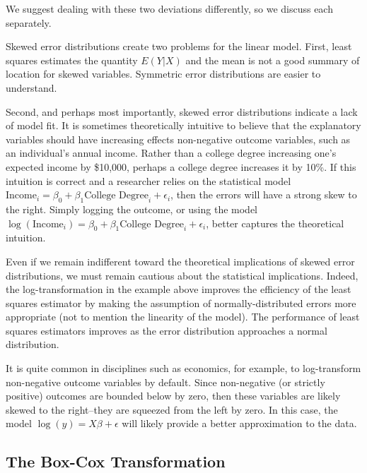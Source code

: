 \documentclass[12pt]{article}
\begin{document}
We suggest dealing with these two deviations differently, so we discuss each separately.

Skewed error distributions create two problems for the linear model. 
First, least squares estimates the quantity $E(Y | X)$ and the mean is not a good summary of location for skewed variables. 
Symmetric error distributions are easier to understand. 

Second, and perhaps most importantly, skewed error distributions indicate a lack of model fit. 
It is sometimes theoretically intuitive to believe that the explanatory variables should have increasing effects non-negative outcome variables, such as an individual's annual income. 
Rather than a college degree increasing one's expected income by \$10,000, perhaps a college degree increases it by 10\%. 
If this intuition is correct and a researcher relies on the statistical model $\text{Income}_i = \beta_0 + \beta_1 \text{College Degree}_i + \epsilon_i$, then the errors will have a strong skew to the right. Simply logging the outcome, or using the model $\log (\text{Income}_i) = \beta_0 + \beta_1 \text{College Degree}_i + \epsilon_i$, better captures the theoretical intuition.

Even if we remain indifferent toward the theoretical implications of skewed error distributions, we must remain cautious about the statistical implications. 
Indeed, the log-transformation in the example above improves the efficiency of the least squares estimator by making the assumption of normally-distributed errors more appropriate (not to mention the linearity of the model).
The performance of least squares estimators improves as the error distribution approaches a normal distribution. 

It is quite common in disciplines such as economics, for example, to log-transform non-negative outcome variables by default. 
Since non-negative (or strictly positive) outcomes are bounded below by zero, then these variables are likely skewed to the right--they are squeezed from the left by zero. 
In this case, the model $\log(y) = X\beta + \epsilon$ will likely provide a better approximation to the data.

\subsection*{The Box-Cox Transformation}
\end{document}
